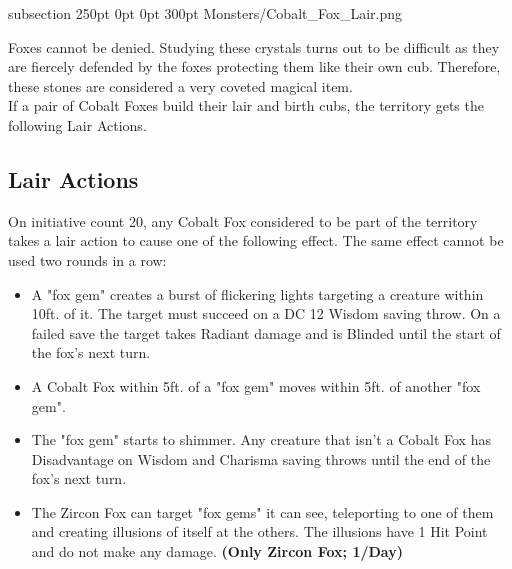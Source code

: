 
\MonsterBannerGraphic%
	{}%
	{subsection}
	{250pt}%
	{0pt} %
	{0pt} %
	{300pt}%
	{Monsters/Cobalt_Fox_Lair.png}%
	{}%
	
%
	
\noindent Foxes cannot be denied. Studying these crystals turns out to be difficult as they are fiercely defended by the foxes protecting them like their own cub. Therefore, these stones are considered a very coveted magical item.\\
If a pair of Cobalt Foxes build their lair and birth cubs, the territory gets the following Lair Actions.

\subsection*{Lair Actions}
On initiative count 20, any Cobalt Fox considered to be part of the territory takes a lair action to cause one of the following effect. The same effect cannot be used two rounds in a row:
\begin{itemize}
	\item A "fox gem" creates a burst of flickering lights targeting a creature within 10ft. of it. The target must succeed on a DC 12 Wisdom saving throw. On a failed save the target takes  Radiant damage and is Blinded until the start of the fox's next turn.
	\item A Cobalt Fox within 5ft. of a "fox gem" moves within 5ft. of another "fox gem".
	\item The "fox gem" starts to shimmer. Any creature that isn't a Cobalt Fox has Disadvantage on Wisdom and Charisma saving throws until the end of the fox's next turn.
	\item The Zircon Fox can target  "fox gems" it can see, teleporting to one of them and creating illusions of itself at the others. The illusions have 1 Hit Point and do not make any damage. \textbf{(Only Zircon Fox; 1/Day)}
\end{itemize}

